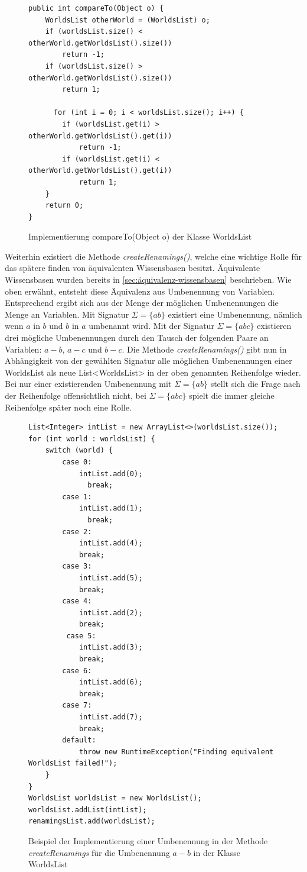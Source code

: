\documentclass[12pt,a4paper]{article}
\begin{document}
\begin{figure}
\begin{lstlisting}
public int compareTo(Object o) {
    WorldsList otherWorld = (WorldsList) o;
    if (worldsList.size() < otherWorld.getWorldsList().size())
        return -1;
    if (worldsList.size() > otherWorld.getWorldsList().size())
        return 1;
          
      for (int i = 0; i < worldsList.size(); i++) {
        if (worldsList.get(i) > otherWorld.getWorldsList().get(i))
            return -1;
        if (worldsList.get(i) < otherWorld.getWorldsList().get(i))
            return 1;
    }
    return 0;
}
\end{lstlisting}
\caption{Implementierung compareTo(Object o) der Klasse WorldsList}
\label{code:compare-worldslist}
\end{figure}

Weiterhin existiert die Methode \textit{createRenamings()}, welche eine wichtige Rolle für das spätere finden von äquivalenten Wissensbasen besitzt. Äquivalente Wissensbasen wurden bereits in  \autoref{sec:äquivalenz-wissensbasen} beschrieben. Wie oben erwähnt, entsteht diese Äquivalenz aus Umbenennung von Variablen. Entsprechend ergibt sich aus der Menge der möglichen Umbenennungen die Menge an Variablen. Mit Signatur $\Sigma=\{ab\}$ existiert eine Umbenennung, nämlich wenn $a$ in $b$ und $b$ in $a$ umbenannt wird. Mit der Signatur $\Sigma=\{abc\}$ existieren drei mögliche Umbenennungen durch den Tausch der folgenden Paare an Variablen: $a-b$, $a-c$ und $b-c$. Die Methode \textit{createRenamings()} gibt nun in Abhängigkeit von der gewählten Signatur alle möglichen Umbenennungen einer WorldsList als neue List<WorldsList> in der oben genannten Reihenfolge wieder. Bei nur einer existierenden Umbenennung mit $\Sigma=\{ab\}$ stellt sich die Frage nach der Reihenfolge offensichtlich nicht, bei $\Sigma=\{abc\}$ spielt die immer gleiche Reihenfolge später noch eine Rolle. \\


\begin{figure}
\begin{lstlisting}
List<Integer> intList = new ArrayList<>(worldsList.size());
for (int world : worldsList) {
    switch (world) {
        case 0:
            intList.add(0);
              break;
        case 1:
            intList.add(1);
              break;
        case 2:
            intList.add(4);
            break;
        case 3:
            intList.add(5);
            break;
        case 4:
            intList.add(2);
            break;
         case 5:
            intList.add(3);
            break;
        case 6:
            intList.add(6);
            break;
        case 7:
            intList.add(7);
            break;
        default:
            throw new RuntimeException("Finding equivalent WorldsList failed!");
    }
}
WorldsList worldsList = new WorldsList();
worldsList.addList(intList);
renamingsList.add(worldsList);
\end{lstlisting}
\caption{Beispiel der Implementierung einer Umbenennung in der Methode \textit{createRenamings} für die Umbenennung $a-b$ in der Klasse WorldsList}
\label{code:renaming}
\end{figure}
\end{document}
